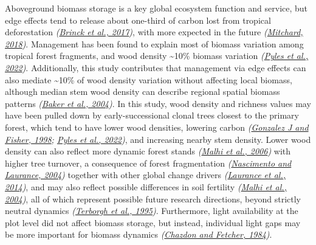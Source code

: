 \documentclass[
  12pt,
]{article}
\begin{document}
Aboveground biomass storage is a key global ecosystem function and service, but edge effects tend to release about one-third of carbon lost from tropical deforestation \emph{(\protect\hyperlink{ref-brinck17}{Brinck et al., 2017})}, with more expected in the future \emph{(\protect\hyperlink{ref-mitchard18}{Mitchard, 2018})}.
Management has been found to explain most of biomass variation among tropical forest fragments, and wood density \textasciitilde10\% biomass variation \emph{(\protect\hyperlink{ref-pyles22}{Pyles et al., 2022})}.
Additionally, this study contributes that management via edge effects can also mediate \textasciitilde10\% of wood density variation without affecting local biomass, although median stem wood density can describe regional spatial biomass patterns \emph{(\protect\hyperlink{ref-baker04}{Baker et al., 2004})}.
In this study, wood density and richness values may have been pulled down by early-successional clonal trees closest to the primary forest, which tend to have lower wood densities, lowering carbon \emph{(\protect\hyperlink{ref-gonzalezj98}{Gonzalez J and Fisher, 1998}; \protect\hyperlink{ref-pyles22}{Pyles et al., 2022})}, and increasing nearby stem density.
Lower wood density can also reflect more dynamic forest stands \emph{(\protect\hyperlink{ref-malhi06}{Malhi et al., 2006})} with higher tree turnover, a consequence of forest fragmentation \emph{(\protect\hyperlink{ref-nascimento04}{Nascimento and Laurance, 2004})} together with other global change drivers \emph{(\protect\hyperlink{ref-laurance14}{Laurance et al., 2014})}, and may also reflect possible differences in soil fertility \emph{(\protect\hyperlink{ref-malhi04}{Malhi et al., 2004})}, all of which represent possible future research directions, beyond strictly neutral dynamics \emph{(\protect\hyperlink{ref-terborgh95}{Terborgh et al., 1995})}.
Furthermore, light availability at the plot level did not affect biomass storage, but instead, individual light gaps may be more important for biomass dynamics \emph{(\protect\hyperlink{ref-chazdon84}{Chazdon and Fetcher, 1984})}.
\end{document}
